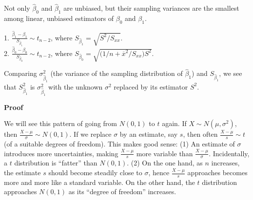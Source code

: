 \documentclass[12pt]{article}
\begin{document}
\alert
Not only $\hat{\beta}_0$ and $\hat{\beta}_1$ are unbiased,
but their sampling variances are the smallest among
linear, unbiased estimators of $\beta_0$ and $\beta_1$.

\alert[Proposition]%
1. $\frac{\hat{\beta}_1 - \beta_1}{S_{\hat{\beta}_1}} \sim t_{n-2}$, where
$S_{\hat{\beta}_1} = \sqrt{S^2 / S_{xx}}$.\\
2. $\frac{\hat{\beta}_0 - \beta_0}{S_{\hat{\beta}_0}} \sim t_{n-2}$, where
$S_{\hat{\beta}_0} = \sqrt{\bigl(1/n + \overline{x}^2/S_{xx}\bigr) S^2}$.

Comparing $\sigma^2_{\hat{\beta}_1}$ (the variance of the
sampling distribution of $\hat{\beta}_1$)
and $S_{\hat{\beta}_1}$,
we see that
$S^2_{\hat{\beta}_1}$ is $\sigma^2_{\hat{\beta}_1}$
with the unknown $\sigma^2$ replaced by its estimator
$S^2$.

\textbf{Proof}


\alert
We will see this pattern of going from $N(0,1)$ to $t$ again.
If $X \sim N(\mu, \sigma^2)$, then $\frac{X - \mu}{\sigma} \sim N(0,1)$.
If we replace $\sigma$ by an estimate, say $s$, then often
$\frac{X - \mu}{s} \sim t$ (of a suitable degrees of freedom).
This makes good sense:
(1) An estimate of $\sigma$ introduces more uncertainties, making
$\frac{X - \mu}{s}$ more variable than $\frac{X - \mu}{\sigma}$.
Incidentally, a $t$ distribution is ``fatter'' than $N(0,1)$.
(2) On the one hand,
as $n$ increases, the estimate $s$ should become steadily close to
$\sigma$, hence $\frac{X - \mu}{s}$ approaches becomes more and more
like a standard variable.
On the other hand, the $t$ distribution approaches $N(0,1)$
as its ``degree of freedom'' increases.
\end{document}
